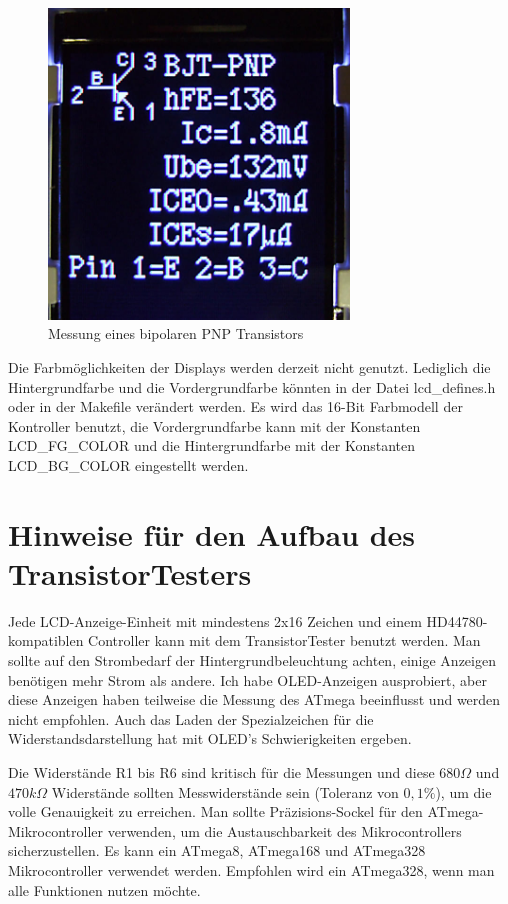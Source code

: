 \begin{figure}[H]
\centering
\includegraphics[width=8cm]{../PNG/Color_PNP_ILI9163.jpg}
\caption{Messung eines bipolaren PNP Transistors}
\label{fig:Color_PNP}
\end{figure}

Die Farbmöglichkeiten der Displays werden derzeit nicht genutzt. Lediglich die Hintergrundfarbe
und die Vordergrundfarbe könnten in der Datei lcd\_defines.h oder in der Makefile verändert werden.
Es wird das 16-Bit Farbmodell der Kontroller benutzt, die Vordergrundfarbe kann mit der Konstanten
LCD\_FG\_COLOR und die Hintergrundfarbe mit der Konstanten LCD\_BG\_COLOR eingestellt werden.

\section{Hinweise für den Aufbau des TransistorTesters}
Jede LCD-Anzeige-Einheit mit mindestens 2x16 Zeichen und einem HD44780-kompatiblen Controller kann mit
dem TransistorTester benutzt werden.
Man sollte auf den Strombedarf der Hintergrundbeleuchtung achten, einige Anzeigen benötigen
mehr Strom als andere.
Ich habe OLED-Anzeigen ausprobiert, aber diese Anzeigen haben teilweise die Messung des
ATmega beeinflusst und werden nicht empfohlen. Auch das Laden der Spezialzeichen für die 
Widerstandsdarstellung hat mit OLED's Schwierigkeiten ergeben.

Die Widerstände R1 bis R6 sind kritisch für die Messungen und diese \(680\Omega\) und
\(470k\Omega\) Widerstände sollten Messwiderstände sein (Toleranz von \(0,1\%\)), um 
die volle Genauigkeit zu erreichen.
Man sollte Präzisions-Sockel für den ATmega-Mikrocontroller verwenden, um
die Austauschbarkeit des Mikrocontrollers sicherzustellen.
Es kann ein ATmega8, ATmega168 und ATmega328 Mikrocontroller verwendet werden.
Empfohlen wird ein ATmega328, wenn man alle Funktionen nutzen möchte.

